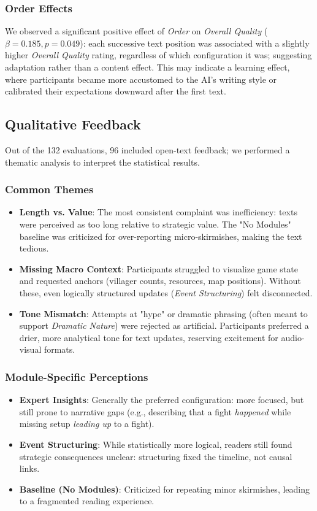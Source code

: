 \subsubsection{Order Effects}
We observed a significant positive effect of \textit{Order} on \textit{Overall Quality} ($\beta=0.185, p=0.049$): each successive text position was associated with a slightly higher \textit{Overall Quality} rating, regardless of which configuration it was; suggesting adaptation rather than a content effect. This may indicate a learning effect, where participants became more accustomed to the AI's writing style or calibrated their expectations downward after the first text.

\subsection{Qualitative Feedback}
Out of the 132 evaluations, 96 included open-text feedback; we performed a thematic analysis to interpret the statistical results.

\subsubsection{Common Themes}
\begin{itemize}[noitemsep,topsep=0pt]
  \item \textbf{Length vs. Value}: The most consistent complaint was inefficiency: texts were perceived as too long relative to strategic value. The "No Modules" baseline was criticized for over-reporting micro-skirmishes, making the text tedious.
  \item \textbf{Missing Macro Context}: Participants struggled to visualize game state and requested anchors (villager counts, resources, map positions). Without these, even logically structured updates (\textit{Event Structuring}) felt disconnected.
  \item \textbf{Tone Mismatch}: Attempts at "hype" or dramatic phrasing (often meant to support \textit{Dramatic Nature}) were rejected as artificial. Participants preferred a drier, more analytical tone for text updates, reserving excitement for audio-visual formats.
\end{itemize}

\subsubsection{Module-Specific Perceptions}
\begin{itemize}[noitemsep,topsep=0pt]
  \item \textbf{Expert Insights}: Generally the preferred configuration: more focused, but still prone to narrative gaps (e.g., describing that a fight \textit{happened} while missing setup \textit{leading up} to a fight).
  \item \textbf{Event Structuring}: While statistically more logical, readers still found strategic consequences unclear: structuring fixed the timeline, not causal links.
  \item \textbf{Baseline (No Modules)}: Criticized for repeating minor skirmishes, leading to a fragmented reading experience.
\end{itemize}


